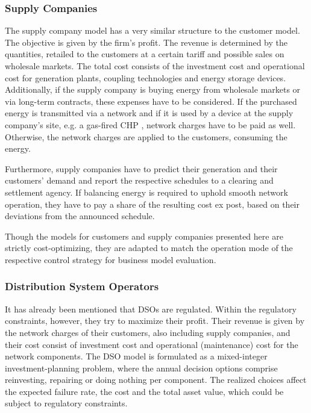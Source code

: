 \documentclass[a4paper,twoside]{article}
\begin{document}
\subsubsection{Supply Companies}
\noindent
The supply company model has a very similar structure to the customer
model. The objective is given by the firm’s profit. The revenue is
determined by the quantities, retailed to the customers at a certain tariff
and possible sales on
wholesale markets.
The
total cost consists of the investment cost and operational cost for
generation plants, coupling technologies and energy storage
devices. Additionally, if the supply company is buying energy from
wholesale markets or via long-term contracts, these expenses have to
be considered. If the purchased energy is transmitted via a network
and if it is used by a device at the supply company’s site, e.g. a gas-fired CHP
, network charges have to be paid as well. Otherwise, the
network charges are applied to the customers, consuming the energy. 

Furthermore, supply companies have to predict their generation and
their customers’ demand and report the respective schedules to a
clearing and settlement agency. If balancing energy is required to
uphold smooth network operation, they have to pay a share of the
resulting cost ex post, based on their deviations from the announced
schedule. 

Though the models for customers and supply companies presented here
are strictly cost-optimizing, they are adapted to match the operation
mode of the respective control strategy for business model
evaluation. 

\subsubsection{Distribution System Operators}
\noindent
It has already been mentioned that DSOs are regulated. Within the
regulatory constraints, however, they try to maximize their
profit. Their revenue is given by the network charges of their
customers, also including supply companies, and their cost consist of
investment cost and operational (maintenance) cost for the network
components. The DSO model is formulated as a mixed-integer
investment-planning problem, where the annual decision options
comprise reinvesting, repairing or doing nothing per component. The
realized choices affect the expected failure rate, the cost and the
total asset value, which could be subject to regulatory constraints. 
\end{document}
